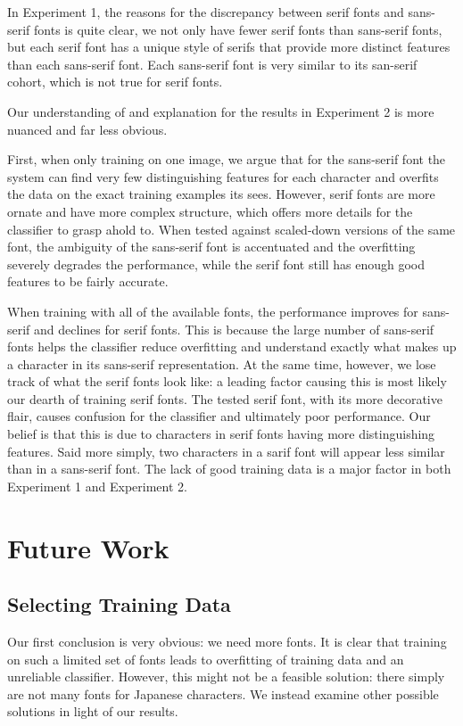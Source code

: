\documentclass[10pt,twocolumn,letterpaper]{article}
\begin{document}
In Experiment 1, the reasons for the discrepancy between serif fonts and sans-serif fonts is quite clear, we not only have fewer serif fonts than sans-serif fonts, but each serif font has a unique style of serifs that provide more distinct features than each sans-serif font. Each sans-serif font is very similar to its san-serif cohort, which is not true for serif fonts.

Our understanding of and explanation for the results in Experiment 2 is more nuanced and far less obvious.

First, when only training on one image, we argue that for the sans-serif font the system can find very few distinguishing features for each character and overfits the data on the exact training examples its sees. However, serif fonts are more ornate and have more complex structure, which offers more details for the classifier to grasp ahold to. When tested against scaled-down versions of the same font, the ambiguity of the sans-serif font is accentuated and the overfitting severely degrades the performance, while the serif font still has enough good features to be fairly accurate.

When training with all of the available fonts, the performance improves for sans-serif and declines for serif fonts. This is because the large number of sans-serif fonts helps the classifier reduce overfitting and understand exactly what makes up a character in its sans-serif representation. At the same time, however, we lose track of what the serif fonts look like: a leading factor causing this is most likely our dearth of training serif fonts. The tested serif font, with its more decorative flair, causes confusion for the classifier and ultimately poor performance. Our belief is that this is due to characters in serif fonts having more distinguishing features. Said more simply, two characters in a sarif font will appear less similar than in a sans-serif font. The lack of good training data is a major factor in both Experiment 1 and Experiment 2.

\section{Future Work}

\subsection{Selecting Training Data}
Our first conclusion is very obvious: we need more fonts. It is clear that training on such a limited set of fonts leads to overfitting of training data and an unreliable classifier. However, this might not be a feasible solution: there simply are not many fonts for Japanese characters. We instead examine other possible solutions in light of our results.
\end{document}
